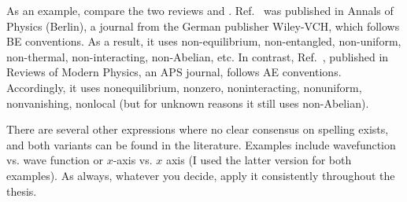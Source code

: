 As an example, compare the two reviews \cite{abaninRecentProgressManybody2017} and \cite{abaninColloquiumManybodyLocalization2019}. Ref.~\cite{abaninRecentProgressManybody2017} was published in Annals of Physics (Berlin), a journal from the German publisher Wiley-VCH, which follows BE conventions. As a result, it uses non-equilibrium, non-entangled, non-uniform, non-thermal, non-interacting, non-Abelian, etc. In contrast, Ref.~\cite{abaninColloquiumManybodyLocalization2019}, published in Reviews of Modern Physics, an APS journal, follows AE conventions. Accordingly, it uses nonequilibrium, nonzero, noninteracting, nonuniform, nonvanishing, nonlocal (but for unknown reasons it still uses non-Abelian).

There are several other expressions where no clear consensus on spelling exists, and both variants can be found in the literature. Examples include wavefunction vs. wave function or $x$-axis vs. $x$ axis (I used the latter version for both examples). As always, whatever you decide, apply it consistently throughout the thesis.
